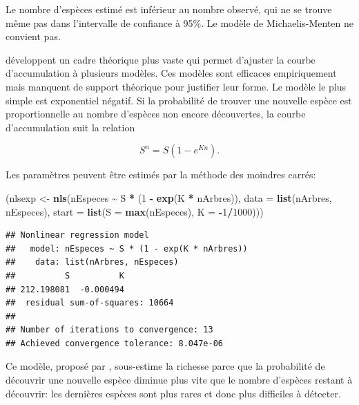 \documentclass[
  11pt,
  french,
  a4paper,
  extrafontsizes,onecolumn,openright
  ]{memoir}
\newenvironment{Shaded}{\begin{snugshade}}{\end{snugshade}}
\newcommand{\AttributeTok}[1]{\textcolor[rgb]{0.13,0.29,0.53}{#1}}
\newcommand{\DecValTok}[1]{\textcolor[rgb]{0.00,0.00,0.81}{#1}}
\newcommand{\FunctionTok}[1]{\textcolor[rgb]{0.13,0.29,0.53}{\textbf{#1}}}
\newcommand{\NormalTok}[1]{#1}
\newcommand{\OtherTok}[1]{\textcolor[rgb]{0.56,0.35,0.01}{#1}}
\newcommand{\SpecialCharTok}[1]{\textcolor[rgb]{0.81,0.36,0.00}{\textbf{#1}}}
\begin{document}
\normalsize

Le nombre d'espèces estimé est inférieur au nombre observé, qui ne se trouve même pas dans l'intervalle de confiance à 95\%.
Le modèle de Michaelis-Menten ne convient pas.

\textcite{Soberon1993} développent un cadre théorique plus vaste qui permet d'ajuster la courbe d'accumulation à plusieurs modèles.
Ces modèles sont efficaces empiriquement mais manquent de support théorique pour justifier leur forme.
Le modèle le plus simple est exponentiel négatif.
Si la probabilité de trouver une nouvelle espèce est proportionnelle au nombre d'espèces non encore découvertes, la courbe d'accumulation suit la relation

\begin{equation} 
  \label{eq:Soberon1993a}
  S^{n} = S \left( 1 - e^{Kn} \right).
\end{equation}

Les paramètres peuvent être estimés par la méthode des moindres carrés:

\scriptsize

\begin{Shaded}
\begin{Highlighting}[]
\NormalTok{(nlsexp }\OtherTok{\textless{}{-}} \FunctionTok{nls}\NormalTok{(nEspeces }\SpecialCharTok{\textasciitilde{}}\NormalTok{ S }\SpecialCharTok{*}\NormalTok{ (}\DecValTok{1} \SpecialCharTok{{-}} \FunctionTok{exp}\NormalTok{(K }\SpecialCharTok{*}\NormalTok{ nArbres)), }\AttributeTok{data =} \FunctionTok{list}\NormalTok{(nArbres,}
\NormalTok{    nEspeces), }\AttributeTok{start =} \FunctionTok{list}\NormalTok{(}\AttributeTok{S =} \FunctionTok{max}\NormalTok{(nEspeces), }\AttributeTok{K =} \SpecialCharTok{{-}}\DecValTok{1}\SpecialCharTok{/}\DecValTok{1000}\NormalTok{)))}
\end{Highlighting}
\end{Shaded}

\begin{verbatim}
## Nonlinear regression model
##   model: nEspeces ~ S * (1 - exp(K * nArbres))
##    data: list(nArbres, nEspeces)
##          S          K 
## 212.198081  -0.000494 
##  residual sum-of-squares: 10664
## 
## Number of iterations to convergence: 13 
## Achieved convergence tolerance: 8.047e-06
\end{verbatim}

\normalsize

Ce modèle, proposé par \textcite{Holdridge1971}, sous-estime la richesse parce que la probabilité de découvrir une nouvelle espèce diminue plus vite que le nombre d'espèces restant à découvrir: les dernières espèces sont plus rares et donc plus difficiles à détecter.
\end{document}
